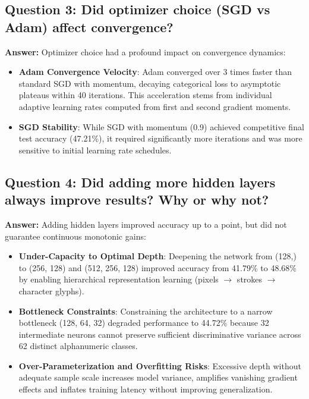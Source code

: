 \documentclass[12pt,a4paper]{article}
\begin{document}
\subsection*{Question 3: Did optimizer choice (SGD vs Adam) affect convergence?}
\textbf{Answer:}
Optimizer choice had a profound impact on convergence dynamics:
\begin{itemize}
\item \textbf{Adam Convergence Velocity}: Adam converged over 3 times faster than standard SGD with momentum, decaying categorical loss to asymptotic plateaus within 40 iterations. This acceleration stems from individual adaptive learning rates computed from first and second gradient moments.
\item \textbf{SGD Stability}: While SGD with momentum (0.9) achieved competitive final test accuracy (47.21\%), it required significantly more iterations and was more sensitive to initial learning rate schedules.
\end{itemize}

\subsection*{Question 4: Did adding more hidden layers always improve results? Why or why not?}
\textbf{Answer:}
Adding hidden layers improved accuracy up to a point, but did not guarantee continuous monotonic gains:
\begin{itemize}
\item \textbf{Under-Capacity to Optimal Depth}: Deepening the network from (128,) to (256, 128) and (512, 256, 128) improved accuracy from 41.79\% to 48.68\% by enabling hierarchical representation learning (pixels $\to$ strokes $\to$ character glyphs).
\item \textbf{Bottleneck Constraints}: Constraining the architecture to a narrow bottleneck (128, 64, 32) degraded performance to 44.72\% because 32 intermediate neurons cannot preserve sufficient discriminative variance across 62 distinct alphanumeric classes.
\item \textbf{Over-Parameterization and Overfitting Risks}: Excessive depth without adequate sample scale increases model variance, amplifies vanishing gradient effects and inflates training latency without improving generalization.
\end{itemize}
\end{document}
